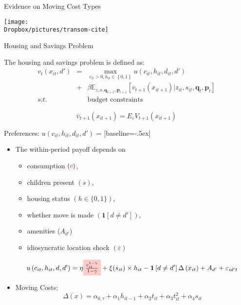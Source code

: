 \documentclass[12pt,english, aspectratio=169]{beamer}
\begin{document}
\begin{frame}{Evidence on Moving Cost Types}
\begin{adjustbox}{center}
\texttt{[image: \\Dropbox/pictures/transom-cite]}
\end{adjustbox}
\end{frame}

\begin{frame}{Housing and Savings Problem}

The housing and savings problem is defined as:
\begin{eqnarray*}
v_{t}\left(x_{it},d'\right) & = & \max_{c_{it}>0,h_{it}\in\left\{ 0,1\right\} }u(c_{it},h_{it},d_{it},d')\\
 & + & \beta\mathbb{E}_{z,s,\mathbf{q}_{t+1},\mathbf{p}_{t+1}}\left[\overline{v}_{t+1}\left(x_{it+1}\right)|z_{it},s_{it},\mathbf{q}_{t},\mathbf{p}_{t}\right]\\
s.t. &  & \text{budget constraints}
\end{eqnarray*}

\textrm{
\[
\overline{v}_{t+1}\left(x_{it+1}\right)=E_{\varepsilon}V_{t+1}\left(x_{it+1}\right)
\]
}
\end{frame}

\begin{frame}{Preferences: $u(c_{it},h_{it},d_{it},d')$}
 = [baseline=-.5ex]

\begin{itemize}
\item The within-period payoff depends on 

\begin{itemize}
\item consumption $({\color{red}{c}})$, 
\item children present $(s)$, 
\item housing status $(h\in\{0,1\})$, 
\item whether move is made \textrm{$\left(\mathbf{1}\left[d\neq d'\right]\right)$,}
\item amenities ($A_{d'}$)
\item idiosyncratic location shock $\left(\varepsilon\right)$
\end{itemize}
\[
u\left(c_{it},h_{it},d,d'\right)=\eta \tikz[baseline]{
            \node[fill=red!20,anchor=base] (t1)
            {$ \frac{c_{it}^{1-\gamma}}{1-\gamma} $};
        } +\xi(s_{it})\times h_{it}-\mathbf{1}\left[d\neq d'\right]\Delta\left(x_{it}\right)+A_{d'}+\varepsilon_{id't}
\]

\item Moving Costs:
\[
\Delta(x)=\alpha_{0,\tau}+\alpha_{1}h_{it-1}+\alpha_{2}t_{it}+\alpha_{3}t_{it}^{2}+\alpha_{4}s_{it}
\]

\end{itemize}
\end{frame}
\end{document}
